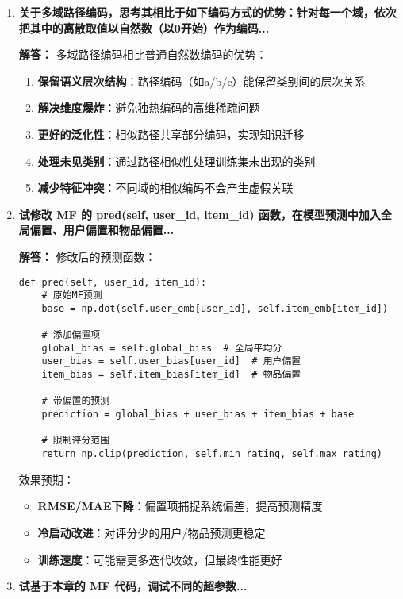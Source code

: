 \documentclass[a4paper,12pt]{book}
\begin{document}
\begin{enumerate}[label=\arabic*.]
    \item \textbf{关于多域路径编码，思考其相比于如下编码方式的优势：针对每一个域，依次把其中的离散取值以自然数（以0开始）作为编码...}
    
    \textbf{解答：} 多域路径编码相比普通自然数编码的优势：
    \begin{enumerate}
        \item \textbf{保留语义层次结构}：路径编码（如a/b/c）能保留类别间的层次关系
        \item \textbf{解决维度爆炸}：避免独热编码的高维稀疏问题
        \item \textbf{更好的泛化性}：相似路径共享部分编码，实现知识迁移
        \item \textbf{处理未见类别}：通过路径相似性处理训练集未出现的类别
        \item \textbf{减少特征冲突}：不同域的相似编码不会产生虚假关联
    \end{enumerate}
    
    \item \textbf{试修改 MF 的 pred(self, user\_id, item\_id) 函数，在模型预测中加入全局偏置、用户偏置和物品偏置...}
    
    \textbf{解答：} 修改后的预测函数：
\begin{verbatim}
def pred(self, user_id, item_id):
    # 原始MF预测
    base = np.dot(self.user_emb[user_id], self.item_emb[item_id])
    
    # 添加偏置项
    global_bias = self.global_bias  # 全局平均分
    user_bias = self.user_bias[user_id]  # 用户偏置
    item_bias = self.item_bias[item_id]  # 物品偏置
    
    # 带偏置的预测
    prediction = global_bias + user_bias + item_bias + base
    
    # 限制评分范围
    return np.clip(prediction, self.min_rating, self.max_rating)
\end{verbatim}
    效果预期：
    \begin{itemize}
        \item \textbf{RMSE/MAE下降}：偏置项捕捉系统偏差，提高预测精度
        \item \textbf{冷启动改进}：对评分少的用户/物品预测更稳定
        \item \textbf{训练速度}：可能需更多迭代收敛，但最终性能更好
    \end{itemize}

    \item \textbf{试基于本章的 MF 代码，调试不同的超参数...}
    

\end{enumerate}
\end{document}
